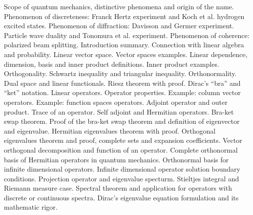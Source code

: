 \begin{multicols}{3}
  Scope of quantum mechanics, distinctive phenomena and origin of the name.
  Phenomenon of discreteness: Franck Hertz experiment and Koch et al. hydrogen excited states.
  Phenomenon of diffraction: Davisson and Germer experiment.
  Particle wave duality and Tonomura et al. experiment.
  Phenomenon of coherence: polarized beam splitting.
  Introduction summary.
  Connection with linear algebra and probability. Linear vector space.
  Vector spaces examples. Linear dependence, dimension, basis and inner product definitions.
  Inner product examples. Orthogonality. Schwartz inequality and triangular inequality. Orthonormality.
  Dual space and linear functionals.
  Riesz theorem with proof.
  Dirac's ``bra'' and ``ket'' notation. Linear operators.
  Operator properties. Example: column vector operators.
  Example: function spaces operators.
  Adjoint operator and outer product.
  Trace of an operator. Self adjoint and Hermitian operators. Bra-ket swap theorem.
  Proof of the bra-ket swap theorem and definition of eigenvector and eigenvalue.
  Hermitian eigenvalues theorem with proof.
  Orthogonal eigenvalues theorem and proof, complete sets and expansion coefficients.
  Vector orthogonal decomposition and function of an operator. Complete orthonormal basis
  of Hermitian operators in quantum mechanics.
  Orthonormal basis for infinite dimensional operators.
  Infinite dimensional operator solution boundary conditions. Projection operator and eigenvalue specturm.
  Stieltjes integral and Riemann measure case.
  Spectral theorem and application for operators with discrete or continuous spectra.
  Dirac's eigenvalue equation formulation and its mathematic rigor.
\end{multicols}

\begin{multicols}{3}
  
\end{multicols}



